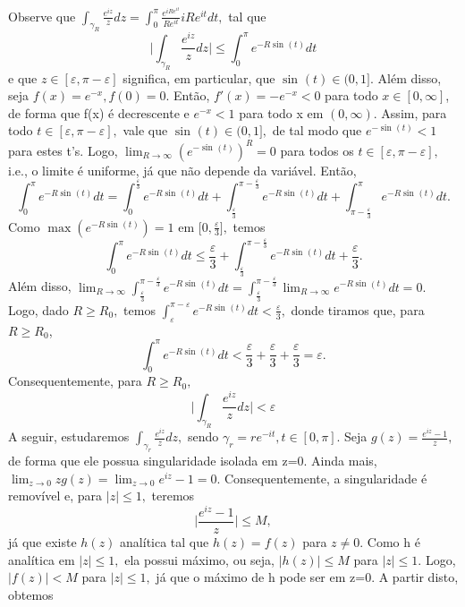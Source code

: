\documentclass[ComplexAnalysis/complex.tex]{subfiles}
\begin{document}
\begin{exer*}
	Observe que \(\int_{\gamma_{R}}^{}\frac{e^{iz}}{z}dz = \int_{0}^{\pi }\frac{e^{iRe^{it}}}{R e^{it}}i R e^{it}dt,\) tal que
	\[
		\biggl\vert \int_{\gamma_{R}}^{}\frac{e^{iz}}{z}dz \biggr\vert \leq \int_{0}^{\pi }e^{-R\sin^{}{(t)}}dt
	\]
	e que \(z\in[\varepsilon , \pi -\varepsilon ]\) significa, em particular, que \(\sin^{}{(t)}\in(0, 1].\) Além disso, seja
	\(f(x) = e^{-x}, f(0) = 0\). Então, \(f'(x) = -e^{-x}<0\) para todo \(x\in [0, \infty]\), de forma que f(x) é decrescente e \(e^{-x}<1\) para
	todo x em \((0, \infty).\) Assim, para todo \(t\in[\varepsilon , \pi -\varepsilon ],\) vale que \(\sin^{}{(t)}\in(0, 1],\) de tal modo
	que \(e^{-\sin^{}{(t)}} < 1\) para estes t's. Logo, \(\lim_{R\to \infty}(e^{-\sin^{}{(t)}})^{R} = 0\) para todos os \(t\in[\varepsilon , \pi -\varepsilon ],\) i.e.,
	o limite é uniforme, já que não depende da variável. Então,
	\[
		\int_{0}^{\pi }e^{-R\sin^{}{(t)}}dt = \int_{0}^{\frac{\varepsilon }{3}}e^{-R\sin^{}{(t)}}dt + \int_{\frac{\varepsilon }{3}}^{\pi - \frac{\varepsilon }{3}}e^{-R\sin^{}{(t)}}dt + \int_{\pi - \frac{\varepsilon }{3}}^{\pi }e^{-R\sin^{}{(t)}}dt.
	\]
	Como \(\max{(e^{-R\sin^{}{(t)}})} = 1\) em \(\biggl[0, \frac{\varepsilon }{3}\biggr],\) temos
	\[
		\int_{0}^{\pi }e^{-R\sin^{}{(t)}}dt \leq \frac{\varepsilon }{3} + \int_{\frac{\varepsilon }{3}}^{\pi - \frac{\varepsilon }{3}}e^{-R\sin^{}{(t)}}dt + \frac{\varepsilon }{3}.
	\]
	Além disso, \(\lim_{R\to \infty}\int_{\frac{\varepsilon }{3}}^{\pi - \frac{\varepsilon }{3}}e^{-R\sin^{}{(t)}}dt = \int_{\frac{\varepsilon }{3}}^{\pi -\frac{\varepsilon }{3}}\lim_{R\to \infty}e^{-R\sin^{}{(t)}}dt = 0.\)
	Logo, dado \(R \geq R_{0},\) temos \(\int_{\varepsilon }^{\pi -\varepsilon }e^{-R\sin^{}{(t)}}dt < \frac{\varepsilon }{3},\) donde tiramos que, para \(R\geq R_{0}\),
	\[
		\int_{0}^{\pi }e^{-R\sin^{}{(t)}}dt < \frac{\varepsilon }{3}+\frac{\varepsilon }{3}+\frac{\varepsilon }{3} = \varepsilon .
	\]
	Consequentemente, para \(R\geq R_{0},\)
	\[
		\biggl\vert \int_{\gamma_{R}}^{}\frac{e^{iz}}{z}dz \biggr\vert < \varepsilon
	\]
	A seguir, estudaremos \(\int_{\gamma_{r}}^{}\frac{e^{iz}}{z}dz,\) sendo \(\gamma_{r} = re^{-it}, t\in[0, \pi ].\)
	Seja \(g(z) = \frac{e^{iz}-1}{z},\) de forma que ele possua singularidade isolada em z=0. Ainda mais, \(\lim_{z\to 0}zg(z)=\lim_{z\to 0}e^{iz}-1 = 0.\)
	Consequentemente, a singularidade é removível e, para \(|z|\leq 1,\) teremos
	\[
		\biggl\vert \frac{e^{iz}-1}{z} \biggr\vert \leq M,
	\]
	já que existe \(h(z)\) analítica tal que \(h(z)=f(z)\) para \(z\neq0\). Como h é analítica em \(|z|\leq 1,\) ela possui máximo, ou seja,
	\(|h(z)|\leq M\) para \(|z|\leq 1.\) Logo, \(|f(z)| < M\) para \(|z|\leq 1,\) já que o máximo de h pode ser em z=0. A partir disto, obtemos

\end{exer*}
\end{document}
